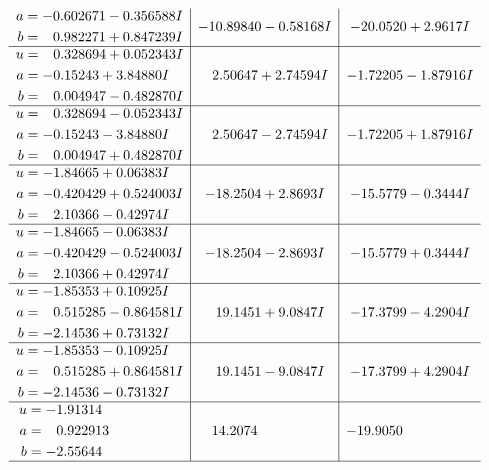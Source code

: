 \documentclass[1p]{elsarticle_modified}
\theoremstyle{definition}
\begin{document}
$$\begin{array}{c|c|c}
\begin{aligned}
a &= -0.602671 - 0.356588 I \\
b &= \phantom{-}0.982271 + 0.847239 I\end{aligned}
 & -10.89840 - 0.58168 I & -20.0520 + 2.9617 I \\ \hline\begin{aligned}
u &= \phantom{-}0.328694 + 0.052343 I \\
a &= -0.15243 + 3.84880 I \\
b &= \phantom{-}0.004947 - 0.482870 I\end{aligned}
 & \phantom{-}2.50647 + 2.74594 I & -1.72205 - 1.87916 I \\ \hline\begin{aligned}
u &= \phantom{-}0.328694 - 0.052343 I \\
a &= -0.15243 - 3.84880 I \\
b &= \phantom{-}0.004947 + 0.482870 I\end{aligned}
 & \phantom{-}2.50647 - 2.74594 I & -1.72205 + 1.87916 I \\ \hline\begin{aligned}
u &= -1.84665 + 0.06383 I \\
a &= -0.420429 + 0.524003 I \\
b &= \phantom{-}2.10366 - 0.42974 I\end{aligned}
 & -18.2504 + 2.8693 I & -15.5779 - 0.3444 I \\ \hline\begin{aligned}
u &= -1.84665 - 0.06383 I \\
a &= -0.420429 - 0.524003 I \\
b &= \phantom{-}2.10366 + 0.42974 I\end{aligned}
 & -18.2504 - 2.8693 I & -15.5779 + 0.3444 I \\ \hline\begin{aligned}
u &= -1.85353 + 0.10925 I \\
a &= \phantom{-}0.515285 - 0.864581 I \\
b &= -2.14536 + 0.73132 I\end{aligned}
 & \phantom{-}19.1451 + 9.0847 I & -17.3799 - 4.2904 I \\ \hline\begin{aligned}
u &= -1.85353 - 0.10925 I \\
a &= \phantom{-}0.515285 + 0.864581 I \\
b &= -2.14536 - 0.73132 I\end{aligned}
 & \phantom{-}19.1451 - 9.0847 I & -17.3799 + 4.2904 I \\ \hline\begin{aligned}
u &= -1.91314\phantom{ +0.000000I} \\
a &= \phantom{-}0.922913\phantom{ +0.000000I} \\
b &= -2.55644\phantom{ +0.000000I}\end{aligned}
 & \phantom{-}14.2074\phantom{ +0.000000I} & -19.9050\phantom{ +0.000000I}\\
 \hline 
 \end{array}$$\newpage\newpage\renewcommand{\arraystretch}{1}
\end{document}
